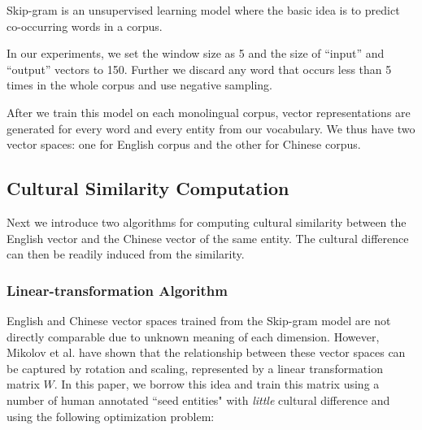 Skip-gram is an unsupervised learning model where the basic idea
is to predict co-occurring words in a corpus.

In our experiments, we set the window size as 5
and the size of ``input'' and ``output'' vectors to 150.
Further we discard any word that occurs less than 5 times in the whole corpus
and use negative sampling.

After we train this model on each monolingual corpus,
vector representations are generated for every word and every entity
from our vocabulary. We thus have two vector spaces:
one for English corpus and the other for Chinese corpus.

\subsection{Cultural Similarity Computation}
\label{sec:sim}
Next we introduce two algorithms for computing cultural similarity between
the English vector and the Chinese vector of the same entity. The
cultural difference can then be readily induced from the similarity.

\subsubsection{Linear-transformation Algorithm}


English and Chinese vector spaces trained from the Skip-gram model
are not directly comparable due to unknown meaning of each dimension.
However, Mikolov et al.  have shown that
the relationship between these vector spaces can be captured by
rotation and scaling, represented by a linear transformation matrix $W$.
In this paper, we borrow this idea and train this matrix
using a number of human annotated ``seed entities" with {\em little}
cultural difference and using the following optimization problem:

